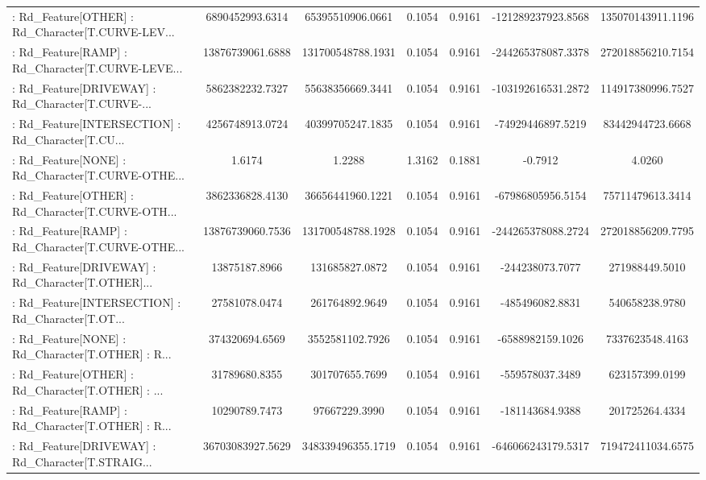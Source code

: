 \begin{longtable}{p{4cm}cccccc}
 : Rd\_Feature[OTHER] : Rd\_Character[T.CURVE-LEV... &   6890452993.6314 &  65395510906.0661 &  0.1054 &       0.9161 & -121289237923.8568 & 135070143911.1196 \\
 : Rd\_Feature[RAMP] : Rd\_Character[T.CURVE-LEVE... &  13876739061.6888 & 131700548788.1931 &  0.1054 &       0.9161 & -244265378087.3378 & 272018856210.7154 \\
 : Rd\_Feature[DRIVEWAY] : Rd\_Character[T.CURVE-... &   5862382232.7327 &  55638356669.3441 &  0.1054 &       0.9161 & -103192616531.2872 & 114917380996.7527 \\
 : Rd\_Feature[INTERSECTION] : Rd\_Character[T.CU... &   4256748913.0724 &  40399705247.1835 &  0.1054 &       0.9161 &  -74929446897.5219 &  83442944723.6668 \\
 : Rd\_Feature[NONE] : Rd\_Character[T.CURVE-OTHE... &            1.6174 &            1.2288 &  1.3162 &       0.1881 &            -0.7912 &            4.0260 \\
 : Rd\_Feature[OTHER] : Rd\_Character[T.CURVE-OTH... &   3862336828.4130 &  36656441960.1221 &  0.1054 &       0.9161 &  -67986805956.5154 &  75711479613.3414 \\
 : Rd\_Feature[RAMP] : Rd\_Character[T.CURVE-OTHE... &  13876739060.7536 & 131700548788.1928 &  0.1054 &       0.9161 & -244265378088.2724 & 272018856209.7795 \\
 : Rd\_Feature[DRIVEWAY] : Rd\_Character[T.OTHER]... &     13875187.8966 &    131685827.0872 &  0.1054 &       0.9161 &    -244238073.7077 &    271988449.5010 \\
 : Rd\_Feature[INTERSECTION] : Rd\_Character[T.OT... &     27581078.0474 &    261764892.9649 &  0.1054 &       0.9161 &    -485496082.8831 &    540658238.9780 \\
 : Rd\_Feature[NONE] : Rd\_Character[T.OTHER] : R... &    374320694.6569 &   3552581102.7926 &  0.1054 &       0.9161 &   -6588982159.1026 &   7337623548.4163 \\
 : Rd\_Feature[OTHER] : Rd\_Character[T.OTHER] : ... &     31789680.8355 &    301707655.7699 &  0.1054 &       0.9161 &    -559578037.3489 &    623157399.0199 \\
 : Rd\_Feature[RAMP] : Rd\_Character[T.OTHER] : R... &     10290789.7473 &     97667229.3990 &  0.1054 &       0.9161 &    -181143684.9388 &    201725264.4334 \\
 : Rd\_Feature[DRIVEWAY] : Rd\_Character[T.STRAIG... &  36703083927.5629 & 348339496355.1719 &  0.1054 &       0.9161 & -646066243179.5317 & 719472411034.6575 \\

\end{longtable}
